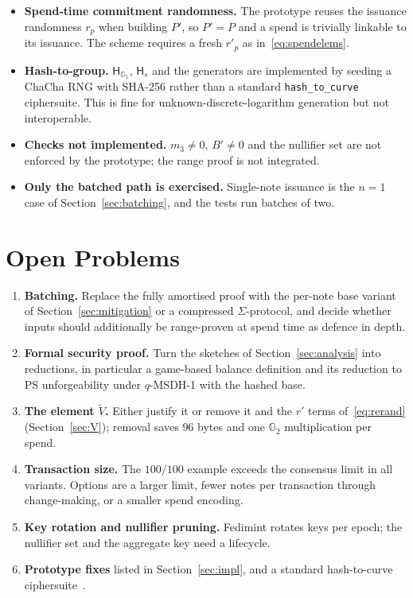 \documentclass[10pt,a5paper]{article}
\newcommand{\K}[1]{#1}                      %
\newcommand{\Go}[1]{#1}                     %
\newcommand{\Gt}[1]{\tilde{#1}}             %
\newcommand{\K}[1]{{\color{ScalarCol}#1}}   %
\newcommand{\Go}[1]{{\color{GoneCol}#1}}    %
\newcommand{\Gt}[1]{{\color{GtwoCol}#1}}    %
\newcommand{\GG}[1]{\mathbb{G}_{#1}}
\newcommand{\Hs}{\mathsf{H}_{s}}
\newcommand{\Hg}{\mathsf{H}_{\GG{1}}}
\begin{document}
\begin{warnbox}
\begin{itemize}[nosep,leftmargin=*]
\item \textbf{Spend-time commitment randomness.} The prototype reuses the
  issuance randomness $\K{r_p}$ when building $\Go{P'}$, so $\Go{P'} = \Go{P}$
  and a spend is trivially linkable to its issuance. The scheme requires a
  fresh $\K{r'_p}$ as in~\eqref{eq:spendelems}.
\item \textbf{Hash-to-group.} $\Hg$, $\Hs$ and the generators are implemented
  by seeding a ChaCha RNG with SHA-256 rather than a standard
  \texttt{hash\_to\_curve} ciphersuite. This is fine for
  unknown-discrete-logarithm generation but not interoperable.
\item \textbf{Checks not implemented.} $\K{m_3} \neq 0$, $\Go{B'} \neq 0$ and
  the nullifier set are not enforced by the prototype; the range proof is not
  integrated.
\item \textbf{Only the batched path is exercised.} Single-note issuance is the
  $n = 1$ case of Section~\ref{sec:batching}, and the tests run batches of two.
\end{itemize}
\end{warnbox}

\section{Open Problems}
\label{sec:open}

\begin{enumerate}[nosep]
  \item \textbf{Batching.} Replace the fully amortised proof with the per-note
        base variant of Section~\ref{sec:mitigation} or a compressed
        $\Sigma$-protocol, and decide whether inputs should additionally be
        range-proven at spend time as defence in depth.
  \item \textbf{Formal security proof.} Turn the sketches of
        Section~\ref{sec:analysis} into reductions, in particular a game-based
        balance definition and its reduction to PS unforgeability under
        $q$-MSDH-1 with the hashed base.
  \item \textbf{The element $\Gt{V}$.} Either justify it or remove it and the
        $\K{r'}$ terms of~\eqref{eq:rerand} (Section~\ref{sec:V}); removal saves
        $96$ bytes and one $\GG{2}$ multiplication per spend.
  \item \textbf{Transaction size.} The $100/100$ example exceeds the consensus
        limit in all variants. Options are a larger limit, fewer notes per
        transaction through change-making, or a smaller spend encoding.
  \item \textbf{Key rotation and nullifier pruning.} Fedimint rotates keys per
        epoch; the nullifier set and the aggregate key need a lifecycle.
  \item \textbf{Prototype fixes} listed in Section~\ref{sec:impl}, and a
        standard hash-to-curve ciphersuite~\cite{rfc9380}.
\end{enumerate}
\end{document}
